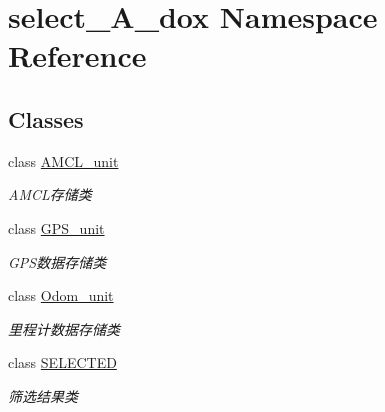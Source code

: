 \hypertarget{namespaceselect___a__dox}{}\section{select\+\_\+\+A\+\_\+dox Namespace Reference}
\label{namespaceselect___a__dox}
\subsection*{Classes}
\begin{DoxyCompactItemize}
\item 
class \hyperlink{classselect___a__dox_1_1_a_m_c_l__unit}{A\+M\+C\+L\+\_\+unit}
\begin{DoxyCompactList}\small\item\em A\+M\+C\+L存储类 \end{DoxyCompactList}\item 
class \hyperlink{classselect___a__dox_1_1_g_p_s__unit}{G\+P\+S\+\_\+unit}
\begin{DoxyCompactList}\small\item\em G\+P\+S数据存储类 \end{DoxyCompactList}\item 
class \hyperlink{classselect___a__dox_1_1_odom__unit}{Odom\+\_\+unit}
\begin{DoxyCompactList}\small\item\em 里程计数据存储类 \end{DoxyCompactList}\item 
class \hyperlink{classselect___a__dox_1_1_s_e_l_e_c_t_e_d}{S\+E\+L\+E\+C\+T\+ED}
\begin{DoxyCompactList}\small\item\em 筛选结果类 \end{DoxyCompactList}\end{DoxyCompactItemize}
